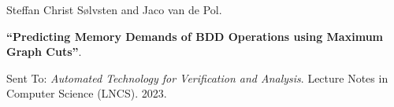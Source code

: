 Steffan Christ Sølvsten and Jaco van de Pol.

{\bf ``Predicting Memory Demands of BDD Operations using Maximum Graph Cuts''}.

Sent To: \emph{Automated Technology for Verification and Analysis}.
Lecture Notes in Computer Science (LNCS). 2023.

\label{cite:2023.tacas}